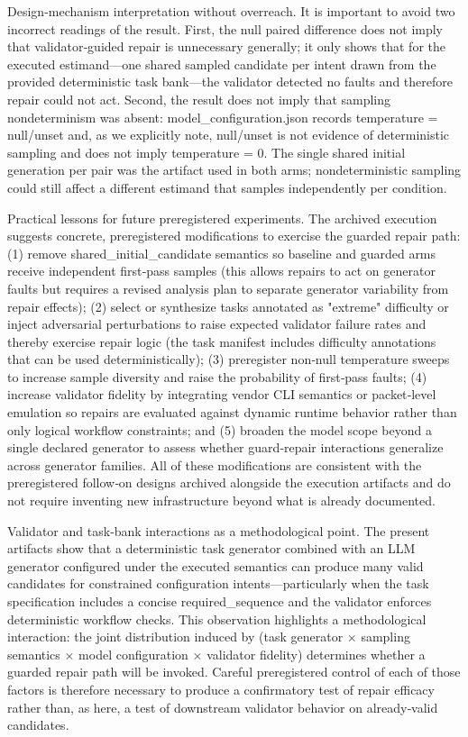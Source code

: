 \documentclass[conference]{IEEEtran}
\begin{document}
Design‑mechanism interpretation without overreach. It is important to avoid two incorrect readings of the result. First, the null paired difference does not imply that validator‑guided repair is unnecessary generally; it only shows that for the executed estimand---one shared sampled candidate per intent drawn from the provided deterministic task bank---the validator detected no faults and therefore repair could not act. Second, the result does not imply that sampling nondeterminism was absent: model\_configuration.json records temperature = null/unset and, as we explicitly note, null/unset is not evidence of deterministic sampling and does not imply temperature = 0. The single shared initial generation per pair was the artifact used in both arms; nondeterministic sampling could still affect a different estimand that samples independently per condition.

Practical lessons for future preregistered experiments. The archived execution suggests concrete, preregistered modifications to exercise the guarded repair path: (1) remove shared\_initial\_candidate semantics so baseline and guarded arms receive independent first‑pass samples (this allows repairs to act on generator faults but requires a revised analysis plan to separate generator variability from repair effects); (2) select or synthesize tasks annotated as "extreme" difficulty or inject adversarial perturbations to raise expected validator failure rates and thereby exercise repair logic (the task manifest includes difficulty annotations that can be used deterministically); (3) preregister non‑null temperature sweeps to increase sample diversity and raise the probability of first‑pass faults; (4) increase validator fidelity by integrating vendor CLI semantics or packet‑level emulation so repairs are evaluated against dynamic runtime behavior rather than only logical workflow constraints; and (5) broaden the model scope beyond a single declared generator to assess whether guard‑repair interactions generalize across generator families. All of these modifications are consistent with the preregistered follow‑on designs archived alongside the execution artifacts and do not require inventing new infrastructure beyond what is already documented.

Validator and task‑bank interactions as a methodological point. The present artifacts show that a deterministic task generator combined with an LLM generator configured under the executed semantics can produce many valid candidates for constrained configuration intents---particularly when the task specification includes a concise required\_sequence and the validator enforces deterministic workflow checks. This observation highlights a methodological interaction: the joint distribution induced by (task generator \ensuremath{\times} sampling semantics \ensuremath{\times} model configuration \ensuremath{\times} validator fidelity) determines whether a guarded repair path will be invoked. Careful preregistered control of each of those factors is therefore necessary to produce a confirmatory test of repair efficacy rather than, as here, a test of downstream validator behavior on already‑valid candidates.
\end{document}
